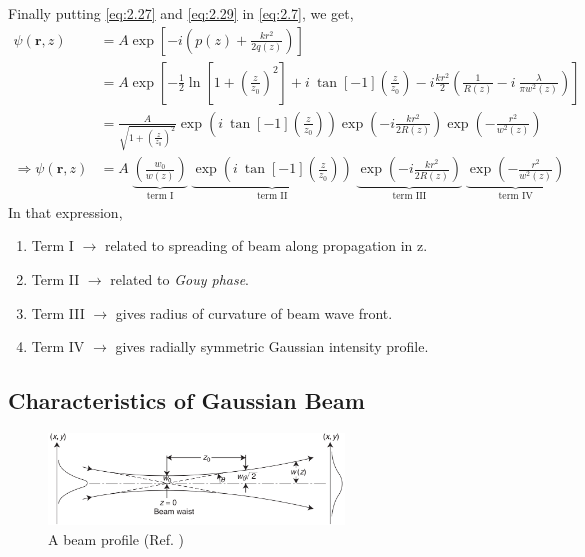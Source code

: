 \documentclass[11pt,a4paper]{article}
\numberwithin{equation}{section}
\begin{document}
Finally putting \ref{eq:2.27} and \ref{eq:2.29} in \ref{eq:2.7}, we get,\cite{kogelnik 66}\cite{cornell}
\begin{align}
	\psi(\boldsymbol{r},z)&= A\exp\left[-i\left(p(z) + \frac{kr^2}{2q(z)}\right)\right]\nonumber\\
	&= A\exp\left[- \frac{1}{2}\ln\left[1+ \left(\frac{z}{z_0}\right)^2\right]+i\: \tan[-1](\frac{z}{z_0}) -i \frac{kr^2}{2}\left(\frac{1}{R(z)} - i\: \frac{\lambda}{\pi w^2(z)}\right) \right]\nonumber\\
	&=\frac{A}{\sqrt{1+ \left(\frac{z}{z_0}\right)^2}} \exp(i\:\tan[-1](\frac{z}{z_0})) \exp(-i\frac{kr^2}{2R(z)}) \exp(-\frac{r^2}{w^2(z)}) \nonumber\\
	\Rightarrow \psi(\boldsymbol{r},z)&=A\; 
	\underbrace{\left(\frac{w_0}{w(z)}\right)}_{\text{term I}}\;
	\underbrace{\exp(i{\:}\tan[-1](\frac{z}{z_0}))}_{\text{term II}}\; \underbrace{\exp(-i\frac{kr^2}{2R(z)})}_{\text{term III}}\;
	\underbrace{\exp(-\frac{r^2}{w^2(z)})}_{\text{term IV}} \label{eq:2.30}
\end{align} 
In that expression,
\begin{enumerate}
	\item Term I $\longrightarrow$ related to spreading of beam along propagation in z.
	\item Term II $\longrightarrow$ related to \textit{Gouy phase}.
	\item Term III $\longrightarrow$ gives radius of curvature of beam wave front.
	\item Term IV $\longrightarrow$ gives radially symmetric Gaussian intensity profile.
	
\end{enumerate}

\subsection{Characteristics of Gaussian Beam }
\begin{figure}[H]
	\centering
	\includegraphics[width=0.7\textwidth]{beam.png}
	\caption{A beam profile (Ref. \cite{milonni})}
	\label{fig:beam}
\end{figure}
\end{document}
